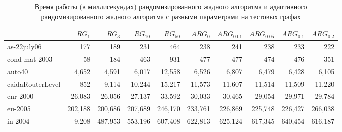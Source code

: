 
\begin{table}[H]
	\caption{Время работы (в миллисекундах) рандомизированного жадного алгоритма и адаптивного рандомизированного жадного алгоритма с разными параметрами на тестовых графах}
 	\label{tab:arg-res-q}
 	{\scriptsize
 	\begin{tabularx}{\textwidth}{Xrrrrrrrrr}\hline
 						& $RG_1$	& $RG_3$	& $RG_{10}$	& $RG_{50}$	& $ARG_0$	&$ARG_{0.01}$	&$ARG_{0.05}$	& $ARG_{0.1}$	& $ARG_{0.2}$	\\\hline
 	as-22july06			& 177		& 189		& 231		& 464		& 238		& 241		& 238		& 233		& 222		\\
 	cond-mat-2003		& 58		& 184		& 463		& 931		& 477		& 477		& 474		& 476		& 351		\\
 	auto40			 	& 4,652		& 4,591		& 6,017		& 12,558	& 6,526		& 6,807		& 6,479		& 6,428		& 6,105		\\
 	caidaRouterLevel 	& 852		& 9,114		& 10,244	& 15,217	& 11,573	& 11,607	& 11,514	& 11,509	& 11,220	\\
 	cnr-2000			& 26,083	& 26,056	& 27,137	& 33,592	& 30,033	& 30,465	& 29,054	& 29,971	& 29,784	\\
 	eu-2005				& 202,188	& 200,686	& 207,689	& 246,170	& 233,761	& 226,869	& 225,748	& 226,427	& 266,038	\\
 	in-2004				& 9,208		& 487,953	& 553,196	& 607,408	& 622,813	& 625,124	& 617,345	& 640,454	& 616,187	\\\hline
 	\end{tabularx}
 	}
\end{table}

